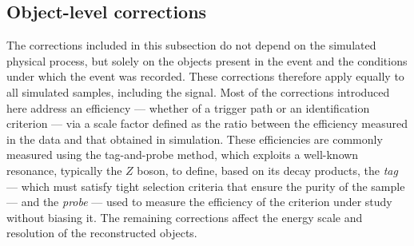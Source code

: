 
\subsection{Object-level corrections}
\label{subsec:bbtt_object_corrections}
%
The corrections included in this subsection do not depend on the simulated physical process, but solely on the objects present in the event and the conditions under which the event was recorded. These corrections therefore apply equally to all simulated samples, including the signal. Most of the corrections introduced here address an efficiency — whether of a trigger path or an identification criterion — via a scale factor defined as the ratio between the efficiency measured in the data and that obtained in simulation. These efficiencies are commonly measured using the tag-and-probe method, which exploits a well-known resonance, typically the $Z$ boson, to define, based on its decay products, the \textit{tag} — which must satisfy tight selection criteria that ensure the purity of the sample — and the \textit{probe} — used to measure the efficiency of the criterion under study without biasing it. The remaining corrections affect the energy scale and resolution of the reconstructed objects. %

